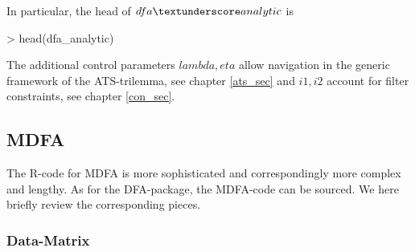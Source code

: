 \documentclass[a4paper]{book}
\begin{document}
In particular, the head of $dfa\textunderscore analytic$ is
\begin{Schunk}
\begin{Sinput}
> head(dfa_analytic)
\end{Sinput}
\begin{Soutput}
1 function (L, lambda, weight_func, Lag, Gamma, eta, cutoff, i1, 
2     i2)                                                        
3 {                                                              
4     K <- length(weight_func) - 1                               
5     omega_Gamma <- as.integer(cutoff * K/pi)                   
6     if ((K - omega_Gamma + 1) > 0) {                           
\end{Soutput}
\end{Schunk}
The additional control parameters $lambda,eta$ allow navigation in the generic framework of the ATS-trilemma, see chapter \ref{ats_sec} and $i1,i2$ account for filter constraints, see chapter \ref{con_sec}. 



\subsection{MDFA}\label{mdfa_intro}

The R-code for MDFA is more sophisticated and correspondingly more complex and lengthy. As for the DFA-package, the MDFA-code can be sourced. We here briefly review the corresponding pieces.


\subsubsection{Data-Matrix}
\end{document}
